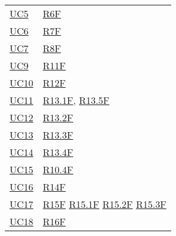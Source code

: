 \begin{center}
\begin{longtable}[!h]{m{50px} m{50px}}
        \hyperref[sec:UC5]{UC5}           & \hyperref[tab:RequisitiFunzionali]{R6F}     \\

        \hyperref[sec:UC6]{UC6}           & \hyperref[tab:RequisitiFunzionali]{R7F}     \\

        \hyperref[sec:UC7]{UC7}           & \hyperref[tab:RequisitiFunzionali]{R8F}     \\

        \hyperref[sec:UC9]{UC9}           & \hyperref[tab:RequisitiFunzionali]{R11F}    \\

        \hyperref[sec:UC10]{UC10}         & \hyperref[tab:RequisitiFunzionali]{R12F}    \\

        \hyperref[sec:UC11]{UC11}         & \hyperref[tab:RequisitiFunzionali]{R13.1F},
        \newline \hyperref[tab:RequisitiFunzionali]{R13.5F}                             \\

        \hyperref[sec:UC12]{UC12}         & \hyperref[tab:RequisitiFunzionali]{R13.2F}  \\

        \hyperref[sec:UC13]{UC13}         & \hyperref[tab:RequisitiFunzionali]{R13.3F}  \\

        \hyperref[sec:UC14]{UC14}         & \hyperref[tab:RequisitiFunzionali]{R13.4F}  \\

        \hyperref[sec:UC15]{UC15}         & \hyperref[tab:RequisitiFunzionali]{R10.4F}  \\

        \hyperref[sec:UC16]{UC16}         & \hyperref[tab:RequisitiFunzionali]{R14F}    \\

        \hyperref[sec:UC17]{UC17}         & \hyperref[tab:RequisitiFunzionali]{R15F}
        \newline \hyperref[tab:RequisitiFunzionali]{R15.1F}
        \newline \hyperref[tab:RequisitiFunzionali]{R15.2F}
        \newline \hyperref[tab:RequisitiFunzionali]{R15.3F}                             \\

        \hyperref[sec:UC18]{UC18}         & \hyperref[tab:RequisitiFunzionali]{R16F}    \\


\end{longtable}
\end{center}
